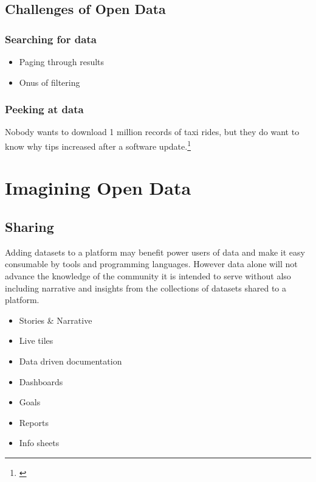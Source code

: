 \documentclass[
  openany]{book}
\providecommand{\tightlist}{%
  \setlength{\itemsep}{0pt}\setlength{\parskip}{0pt}}
\begin{document}
\hypertarget{challenges-of-open-data}{%
\section{Challenges of Open Data}\label{challenges-of-open-data}}

\hypertarget{searching-for-data}{%
\subsection{Searching for data}\label{searching-for-data}}

\begin{itemize}
\tightlist
\item
  Paging through results
\item
  Onus of filtering
\end{itemize}

\hypertarget{peeking-at-data}{%
\subsection{Peeking at data}\label{peeking-at-data}}

Nobody wants to download 1 million records of taxi rides, but they do want to know why tips increased after a software update.\footnote{\citet{iquantny2020}}

\hypertarget{imagine}{%
\chapter{Imagining Open Data}\label{imagine}}

\hypertarget{sharing}{%
\section{Sharing}\label{sharing}}

Adding datasets to a platform may benefit power users of data and make it easy consumable by tools and programming languages. However data alone will not advance the knowledge of the community it is intended to serve without also including narrative and insights from the collections of datasets shared to a platform.

\begin{itemize}
\tightlist
\item
  Stories \& Narrative
\item
  Live tiles
\item
  Data driven documentation
\item
  Dashboards
\item
  Goals
\item
  Reports
\item
  Info sheets
\end{itemize}
\end{document}

